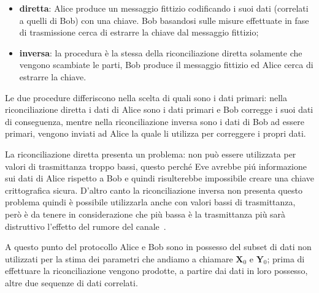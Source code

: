 \begin{itemize}
\item \textbf{diretta}: Alice produce un messaggio fittizio codificando i suoi dati (correlati a quelli di Bob) con una chiave. Bob basandosi sulle misure effettuate in fase di trasmissione cerca di estrarre la chiave dal messaggio fittizio;
\item \textbf{inversa}: la procedura \`e la stessa della riconciliazione diretta solamente che vengono scambiate le parti, Bob produce il messaggio fittizio ed Alice cerca di estrarre la chiave.
\end{itemize} 

Le due procedure differiscono nella scelta di quali sono i dati primari: nella riconciliazione diretta i dati di Alice sono i dati primari e Bob corregge i suoi dati di conseguenza, mentre nella riconciliazione inversa sono i dati di Bob ad essere primari, vengono inviati ad Alice la quale li utilizza per correggere i propri dati. 
 
La riconciliazione diretta presenta un problema: non pu\`o essere utilizzata per valori di trasmittanza troppo bassi, questo perch\'e Eve avrebbe pi\'u informazione sui dati di Alice rispetto a Bob e quindi risulterebbe impossibile creare una chiave crittografica sicura. D'altro canto la riconciliazione inversa non presenta questo problema quindi \`e possibile utilizzarla anche con valori bassi di trasmittanza, per\`o \`e da tenere in considerazione che pi\`u bassa \`e la trasmittanza pi\`u sar\`a distruttivo l'effetto del rumore del canale~\cite{https://doi.org/10.1002/qute.201800011}.


A questo punto del protocollo Alice e Bob sono in possesso del subset di dati non utilizzati per la stima dei parametri che andiamo a chiamare $\textbf{X}_0$ e $\textbf{Y}_0$; prima di effettuare la riconciliazione vengono prodotte, a partire dai dati in loro possesso, altre due sequenze di dati correlati. 

